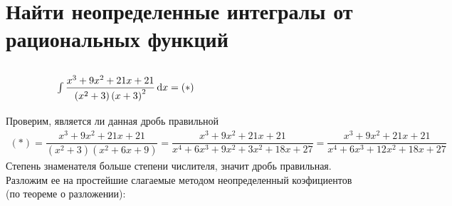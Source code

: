 \documentclass{article}
\begin{document}
		\section{Найти неопределенные интегралы от рациональных функций}
			\subsection*{\ \ \ \ \ \ $\int \dfrac{x^3 + 9x^2 + 21x + 21}{\left(x^2 + 3\right)\left(x + 3\right)^2} \dif x = (*)$}
				Проверим, является ли данная дробь правильной
				\begin{multline*}
					(*) = \dfrac{x^3 + 9x^2 + 21x + 21}{\left(x^2 + 3\right)\left(x^2 + 6x + 9\right)} = \dfrac{x^3 + 9x^2 + 21x + 21}{x^4 + 6x^3 + 9x^2 + 3x^2 + 18x + 27} = \dfrac{x^3 + 9x^2 + 21x + 21}{x^4 + 6x^3 + 12x^2 + 18x + 27}
				\end{multline*}
				Степень знаменателя больше степени числителя, значит дробь правильная. Разложим ее на простейшие слагаемые методом неопределенный коэфициентов (по теореме о разложении):
\end{document}
